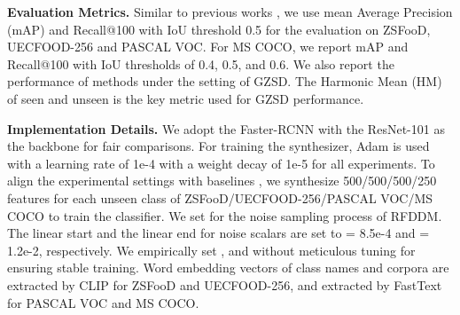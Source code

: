 \noindent\textbf{Evaluation Metrics.}
Similar to previous works \cite{bansal2018zero, huang2022robust}, we use mean Average Precision (mAP) and Recall@100 with IoU threshold 0.5 for the evaluation on ZSFooD, UECFOOD-256 and PASCAL VOC. For MS COCO, we report mAP and Recall@100 with IoU thresholds of 0.4, 0.5, and 0.6. We also report the performance of methods under the setting of GZSD. The Harmonic Mean (HM) of seen and unseen is the key metric used for GZSD performance. 

\noindent\textbf{Implementation Details.}
We adopt the Faster-RCNN \cite{fasterrcnn} with the ResNet-101 \cite{resnet} as the backbone for fair comparisons. For training the synthesizer, Adam \cite{adam2014} is used with a learning rate of 1e-4 with a weight decay of 1e-5 for all experiments. To align the experimental settings with baselines \cite{hayat2020synthesizing,huang2022robust}, we synthesize 500/500/500/250 features for each unseen class of ZSFooD/UECFOOD-256/PASCAL VOC/MS COCO to train the classifier. We set  for the noise sampling process of RFDDM. The linear start and the linear end for noise scalars are set to  = 8.5e-4 and  = 1.2e-2, respectively. We empirically set ,  and  without meticulous tuning for ensuring stable training. Word embedding vectors of class names and corpora are extracted by CLIP \cite{radford2021learning} for ZSFooD and UECFOOD-256, and extracted by FastText \cite{mikolov2018advances} for PASCAL VOC and MS COCO.


\begin{table}[!t]
  \centering
  \renewcommand{\arraystretch}{0.75}
  \caption{Comparison of mAP on PASCAL VOC (\%).}
  \label{tab:voc}\end{table}

